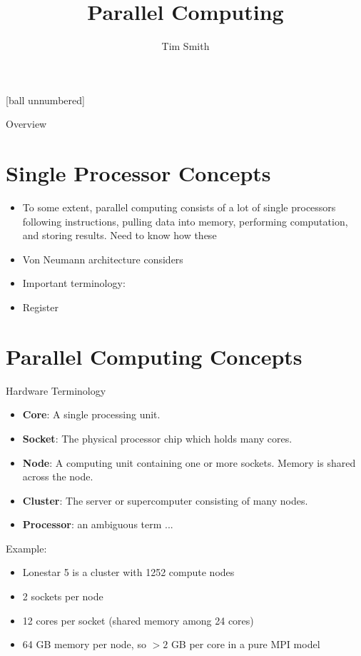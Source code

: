 \documentclass[pdf]{beamer}
\title{Parallel Computing}
\author{Tim Smith}
\begin{document}
 \begin{frame}
  \titlepage
 \end{frame}
 
 [ball unnumbered]
 \begin{frame}{Overview}

  \tableofcontents
 \end{frame}
 
 \section{Single Processor Concepts}
 \begin{frame}
  \begin{itemize} %
	\item To some extent, parallel computing consists of a lot of single processors following instructions, pulling data into memory, performing computation, and storing results. Need to know how these 
	\item Von Neumann architecture considers 
	\item Important terminology: 
	\item Register
   \end{itemize}
  \end{frame}



 \section{Parallel Computing Concepts}
 \begin{frame}{Hardware Terminology}
  \begin{itemize}
	\item \textbf{Core}: A single processing unit. 
	\item \textbf{Socket}: The physical processor chip which holds many cores.
	\item \textbf{Node}: A computing unit containing one or more sockets. Memory is shared across the node. 
	\item \textbf{Cluster}: The server or supercomputer consisting of many nodes.
	\item \textbf{Processor}: an ambiguous term ...
  \end{itemize} 	
  
  Example: 
  \begin{itemize}
	\item Lonestar 5 is a cluster with 1252 compute nodes 
	\item 2 sockets per node
	\item 12 cores per socket (shared memory among 24 cores)
	\item 64 GB memory per node, so $>2$ GB per core in a pure MPI model 
  \end{itemize}
 \end{frame} 
\end{document}
